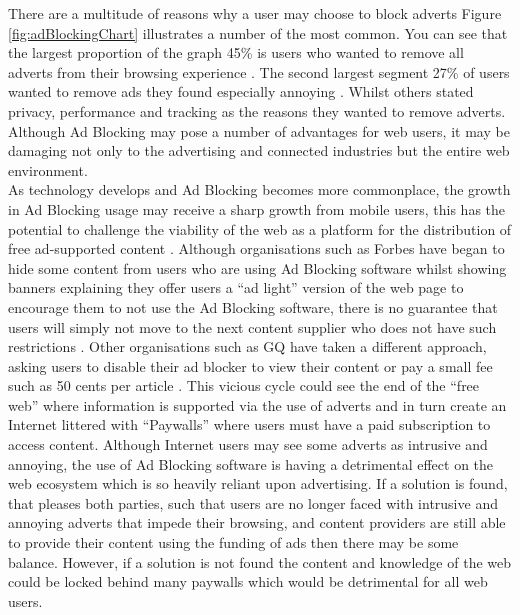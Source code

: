 \documentclass[12pt]{article}
\begin{document}
There are a multitude of reasons why a user may choose to block adverts Figure \ref{fig:adBlockingChart} illustrates a number of the most common. You can see that the largest proportion of the graph 45\% is users who wanted to remove all adverts from their browsing experience \parencite{publishersWeb}. The second largest segment 27\% of users wanted to remove ads they found especially annoying \parencite{publishersWeb}. Whilst others stated privacy, performance and tracking as the reasons they wanted to remove adverts. Although Ad Blocking may pose a number of advantages for web users, it may be damaging not only to the advertising and connected industries but the entire web environment. \\

As technology develops and Ad Blocking becomes more commonplace, the growth in Ad Blocking usage may receive a sharp growth from mobile users,  this has the potential to challenge the viability of the web as a platform for the distribution of free ad-supported content \parencite{adobeAdBlock}. Although organisations such as Forbes have began to hide some content from users who are using Ad Blocking software whilst showing banners explaining they offer users a ``ad light'' version of the web page to encourage them to not use the Ad Blocking software, there is no guarantee that users will simply not move to the next content supplier who does not have such restrictions \parencite{publishersWeb}. Other organisations such as GQ have taken a different approach, asking users to disable their ad blocker to view their content or pay a small fee such as 50 cents per article \parencite{gq}.  This vicious cycle could see the end of the ``free web'' where information is supported via the use of adverts and in turn create an Internet littered with ``Paywalls'' where users must have a paid subscription to access content. Although Internet users may see some adverts as intrusive and annoying, the use of Ad Blocking software is having a detrimental effect on the web ecosystem which is so heavily reliant upon advertising. If a solution is found, that pleases both parties, such that users are no longer faced with intrusive and annoying adverts that impede their browsing, and content providers are still able to provide their content using the funding of ads then there may be some balance. However, if a solution is not found the content and knowledge of the web could be locked behind many paywalls which would be detrimental for all web users.
\end{document}
